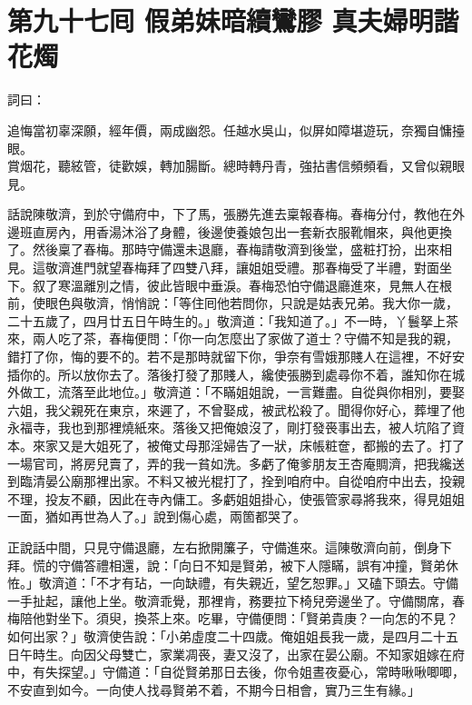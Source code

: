 
\chapter*{第九十七囘 假弟妹暗續鸞膠 真夫婦明諧花燭}


詞曰：

\begin{myquote}
追悔當初辜深願，經年價，兩成幽怨。任越水吳山，似屏如障堪遊玩，奈獨自慵擡眼。\\賞烟花，聽絃管，徒歡娛，轉加腸斷。總時轉丹青，強拈書信頻頻看，又曾似親眼見。
\end{myquote}

話說陳敬濟，到於守備府中，下了馬，張勝先進去稟報春梅。春梅分付，教他在外邊班直房內，用香湯沐浴了身體，後邊使養娘包出一套新衣服靴帽來，與他更換了。然後稟了春梅。那時守備還未退廳，春梅請敬濟到後堂，盛粧打扮，出來相見。這敬濟進門就望春梅拜了四雙八拜，讓姐姐受禮。那春梅受了半禮，對面坐下。叙了寒溫離別之情，彼此皆眼中垂淚。春梅恐怕守備退廳進來，見無人在根前，使眼色與敬濟，{}悄悄說：「等住囘他若問你，只說是姑表兄弟。我大你一歲，二十五歲了，四月廿五日午時生的。」敬濟道：「我知道了。」不一時，丫鬟拏上茶來，兩人吃了茶，春梅便問：「你一向怎麼出了家做了道士？守備不知是我的親，錯打了你，悔的要不的。若不是那時就留下你，爭奈有雪娥那賤人在這裡，不好安插你的。{}所以放你去了。落後打發了那賤人，纔使張勝到處尋你不着，誰知你在城外做工，流落至此地位。」敬濟道：「不瞞姐姐說，一言難盡。自從與你相別，要娶六姐，我父親死在東京，來遲了，不曾娶成，被武松殺了。聞得你好心，葬埋了他永福寺，我也到那裡燒紙來。落後又把俺娘沒了，剛打發䘮事出去，被人坑陷了資本。{}來家又是大姐死了，被俺丈母那淫婦告了一狀，{}床帳粧奩，都搬的去了。打了一場官司，將房兒賣了，弄的我一貧如洗。多虧了俺爹朋友王杏庵賙濟，把我纔送到臨清晏公廟那裡出家。不料又被光棍打了，拴到咱府中。自從咱府中出去，投親不理，投友不顧，因此在寺內傭工。多虧姐姐掛心，使張管家尋將我來，得見姐姐一面，猶如再世為人了。」{}說到傷心處，兩箇都哭了。

正說話中間，只見守備退廳，左右掀開簾子，守備進來。這陳敬濟向前，倒身下拜。慌的守備答禮相還，說：「向日不知是賢弟，被下人隱瞞，誤有冲撞，賢弟休恠。」敬濟道：「不才有玷，一向缺禮，有失親近，望乞恕罪。」又磕下頭去。守備一手扯起，讓他上坐。敬濟乖覺，那裡肯，務要拉下椅兒旁邊坐了。守備關席，春梅陪他對坐下。須臾，換茶上來。吃畢，守備便問：「賢弟貴庚？一向怎的不見？如何出家？」敬濟使告說：「小弟虛度二十四歲。俺姐姐長我一歲，是四月二十五日午時生。向因父母雙亡，家業凋䘮，妻又沒了，出家在晏公廟。不知家姐嫁在府中，有失探望。」守備道：「自從賢弟那日去後，你令姐晝夜憂心，常時啾啾唧唧，不安直到如今。{}一向使人找尋賢弟不着，不期今日相會，實乃三生有緣。」

